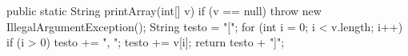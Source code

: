 \begin{unipdcode}[language=Java]
public static String printArray(int[] v) {
    if (v == null) throw new IllegalArgumentException();
    String testo = "[";
    for (int i = 0; i < v.length; i++) {
        if (i > 0) testo += ", ";
        testo += v[i];
    }
    return testo + "]";
}
\end{unipdcode}
